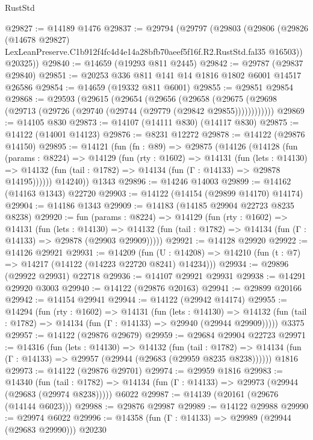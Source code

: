 \begin{lexlean}{RustStd}
\begin{coremodule}
@29827 := @14189 @1476
@29837 := @29794
    (@29797
      (@29803
        (@29806
          (@29826
            (@14678 @29827)
            LexLeanPreserve.C1b912f4fc4d4e14a28bfb70aeef5f16f.R2.RustStd.fal35
            @16503))
        @20325))
@29840 := @14659 (@19293 @811 @2445)
@29842 := @29787 (@29837 @29840)
@29851 := @20253 @336 @811 @141 @14 @1816 @1802 @6001 @14517 @26586
@29854 := @14659 (@19332 @811 @6001)
@29855 := @29851 @29854
@29868 := @29593
    (@29615
      (@29654
        (@29656
          (@29658 (@29675 (@29698 (@29713 (@29726 (@29740 (@29744 (@29779 (@29842 @29855))))))))))))
@29869 := @14105 @830
@29873 := @14107 (@14111 @830) (@14117 @830)
@29875 := @14122 (@14001 @14123)
@29876 := @8231 @12272
@29878 := @14122 (@29876 @14150)
@29895 := @14121
    (fun (fn : @89) =>
    @29875
      (@14126
        (@14128
          (fun (params : @8224) =>
          @14129
            (fun (rty : @1602) =>
            @14131
              (fun (lets : @14130) =>
              @14132 (fun (tail : @1782) => @14134 (fun (Γ : @14133) => @29878 @14195))))))
        @14240))
    @1343
@29896 := @14246 @14003
@29899 := @14162 (@14163 @1343) @22720
@29903 := @14122 (@14154 (@29899 @14170) @14174)
@29904 := @14186 @1343
@29909 := @14183 (@14185 @29904 @22723 @8235 @8238)
@29920 := fun (params : @8224) =>
  @14129
    (fun (rty : @1602) =>
    @14131
      (fun (lets : @14130) =>
      @14132 (fun (tail : @1782) => @14134 (fun (Γ : @14133) => @29878 (@29903 @29909)))))
@29921 := @14128 @29920
@29922 := @14126 @29921
@29931 := @14209
    (fun (U : @14208) => @14210 (fun (t : @7) => @14217 (@14122 (@14223 @22720 @8241) @14234)))
@29934 := @29896 (@29922 @29931) @22718
@29936 := @14107 @29921 @29931
@29938 := @14291 @29920 @3003
@29940 := @14122 (@29876 @20163)
@29941 := @29899 @20166
@29942 := @14154 @29941
@29944 := @14122 (@29942 @14174)
@29955 := @14294
    (fun (rty : @1602) =>
    @14131
      (fun (lets : @14130) =>
      @14132 (fun (tail : @1782) => @14134 (fun (Γ : @14133) => @29940 (@29944 @29909)))))
    @3375
@29957 := @14122 (@29876 @29679)
@29959 := @29684 @29904 @22723
@29971 := @14316
    (fun (lets : @14130) =>
    @14132
      (fun (tail : @1782) =>
      @14134 (fun (Γ : @14133) => @29957 (@29944 (@29683 (@29959 @8235 @8238))))))
    @1816
@29973 := @14122 (@29876 @29701)
@29974 := @29959 @1816
@29983 := @14340
    (fun (tail : @1782) => @14134 (fun (Γ : @14133) => @29973 (@29944 (@29683 (@29974 @8238)))))
    @6022
@29987 := @14139 (@20161 (@29676 (@14144 @6023)))
@29988 := @29876 @29987
@29989 := @14122 @29988
@29990 := @29974 @6022
@29996 := @14358 (fun (Γ : @14133) => @29989 (@29944 (@29683 @29990))) @20230

\end{coremodule}
\end{lexlean}
